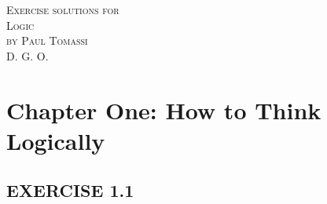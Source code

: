 \documentclass[a4paper,12pt]{article}
\begin{document}
    \begin{titlepage}
        \begin{center}
            \textsc{\large Exercise solutions for\\
            Logic\\
            by Paul Tomassi}\\[1.5cm]
            \textsc{D. G. O.}
        \end{center}
    \end{titlepage}

    \newpage

    \section*{Chapter One: How to Think Logically}

    \subsection*{EXERCISE 1.1}
\end{document}
